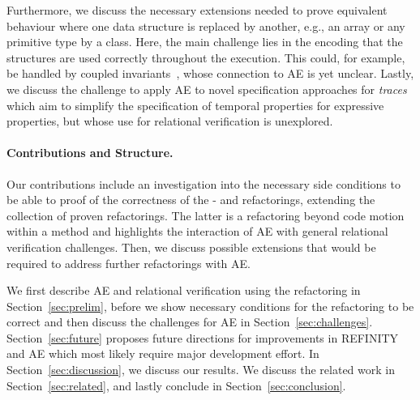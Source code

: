 Furthermore, we discuss the necessary extensions needed to prove equivalent behaviour where one data structure is replaced by another, e.g., an array or any primitive type by a class.
Here, the main challenge lies in the encoding that the structures are used correctly throughout the execution.
This could, for example, be handled by coupled invariants~\cite{DBLP:conf/birthday/BeckertU18}, whose connection to AE is yet unclear. 
Lastly, we discuss the challenge to apply AE to novel specification approaches for \emph{traces} which aim to simplify the specification of temporal properties for expressive properties, but whose use for relational verification is unexplored.

\paragraph{Contributions and Structure.}
Our contributions include an investigation into the necessary side conditions to be able to proof of the correctness of the - and  refactorings, extending the collection of proven refactorings.
The latter is a refactoring beyond code motion within a method and highlights the interaction of AE with general relational verification challenges.
Then, we discuss possible extensions that would be required to address further refactorings with AE.

We first describe AE and relational verification using the  refactoring in Section~\ref{sec:prelim}, before we show necessary conditions for the  refactoring to be correct  and then discuss the challenges for AE in Section~\ref{sec:challenges}.
Section~\ref{sec:future} proposes future directions for improvements in REFINITY and AE which most likely require major development effort.
In Section~\ref{sec:discussion}, we discuss our results. We discuss the related work in  Section~\ref{sec:related}, and lastly conclude in Section~\ref{sec:conclusion}.



